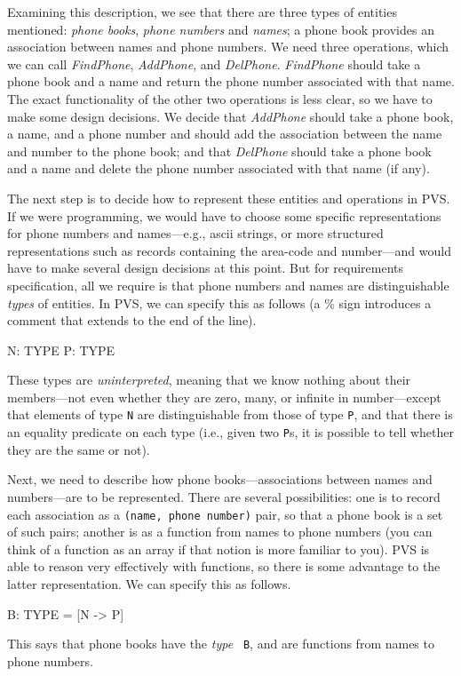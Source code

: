 Examining this description, we see that there are three types of
entities mentioned: {\em phone books}, {\em phone numbers} and {\em
names\/}; a phone book provides an association between names and
phone numbers.  We need three operations, which we can call {\em
FindPhone\/}, {\em AddPhone}, and {\em DelPhone\/}.  {\em FindPhone\/}
should take a phone book and a name and return the phone number
associated with that name.  The exact functionality of the other two
operations is less clear, so we have to make some design decisions.
We decide that {\em AddPhone} should take a phone book, a name, and a
phone number and should add the association between the name and
number to the phone book; and that {\em DelPhone\/} should take a
phone book and a name and delete the phone number associated with that
name (if any).

The next step is to decide how to represent these entities and operations
in PVS\@.  If we were programming, we would have to choose some specific
representations for phone numbers and names---e.g., ascii strings, or
more structured representations such as records containing the
area-code and number---and would have to make several design decisions
at this point.  But for requirements specification, all we require is
that phone numbers and names are distinguishable {\em types\/} of
entities.  In PVS, we can specify this as follows (a \% sign
introduces a comment that extends to the end of the line).
\begin{pvsexample}
N: TYPE              %
P: TYPE              %
\end{pvsexample}
These types are {\em uninterpreted\/}, meaning that we know nothing
about their members---not even whether they are zero, many, or
infinite in number---except that elements of type {\tt N} are
distinguishable from those of type {\tt P}, and that there is an
equality predicate on each type (i.e., given two {\tt P}s, it is
possible to tell whether they are the same or not).

Next, we need to describe how phone books---associations between names
and numbers---are to be represented.  There are several possibilities:
one is to record each association as a {\tt (name, phone number)}
pair, so that a phone book is a set of such pairs; another is as a
function from names to phone numbers (you can think of a function as
an array if that notion is more familiar to you).  PVS is able to
reason very effectively with functions, so there is some advantage to
the latter representation.  We can specify this as follows.
\begin{pvsexample}
B: TYPE = [N -> P]   %
\end{pvsexample}
This says that phone books have the {\em type\/} {\tt
B}, and are functions from names to phone numbers.

